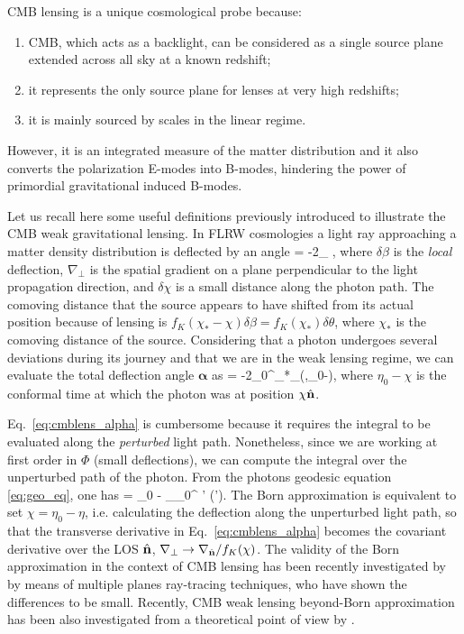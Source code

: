 \gls{CMB} lensing is a unique cosmological probe because:
\begin{enumerate} 
\item{\gls{CMB}, which acts as a backlight, can be 
considered as a single source plane extended across all sky at a known redshift;}
\item{it represents the only 
source plane for lenses at very high redshifts;} 
\item{it is mainly sourced by scales in the 
linear regime.} 
\end{enumerate}
However, it is an integrated measure of the matter distribution and it also converts the 
polarization E-modes into B-modes, hindering the power of primordial gravitational induced B-modes.

Let us recall here some useful definitions previously introduced to illustrate the \gls{CMB} weak gravitational 
lensing. In \gls{FLRW} cosmologies a light ray approaching a matter density distribution is deflected by an angle
%
\be
\delta\beta = -2\delta\chi\nabla_{\perp} \Phi,
\ee
%
where $\delta\beta$ is the \emph{local} deflection, $\nabla_{\perp}$ is the spatial gradient on a plane 
perpendicular to the light propagation direction, and $\delta\chi$ is a small distance along the photon path.
The comoving distance that the source appears to have shifted from its actual position because of lensing
is $f_K(\chi_*-\chi)\delta\beta = f_K(\chi_*)\delta\theta$, where $\chi_*$ is the comoving distance of the 
source. Considering that a photon undergoes several deviations during its journey and that we are in the
weak lensing regime, we can evaluate the total deflection angle $\bm{\alpha}$ as
%
\be
\label{eq:cmblens_alpha}
\bm{\alpha} = -2\int_0^{\chi_*}\diff\chi{}\nabla_{\perp}\Phi(\chi\nver,\eta_0-\chi),
\ee
%
where $\eta_0-\chi$ is the conformal time at which the photon was at position $\chi\hat{\mathbf{n}}$.

Eq.~\eqref{eq:cmblens_alpha} is cumbersome because it requires the integral to be evaluated along the 
\emph{perturbed} light path. Nonetheless, since we are working at first order in $\Phi$ (small deflections),
we can compute the integral over the unperturbed path of the photon. From the photons geodesic 
equation \eqref{eq:geo_eq}, one has
%
\be
\chi = \eta_0 - \int_{\eta_0}^{\eta} \diff \eta' \Phi(\eta').
\ee
%
The Born approximation is equivalent to set $\chi=\eta_0-\eta$, i.e. calculating the deflection along the 
unperturbed light path, so that the transverse derivative in Eq.~\eqref{eq:cmblens_alpha} becomes the 
covariant derivative over the LOS $\hat{\mathbf{n}}$, $\nabla_{\perp} \to \nabla_{\hat{\mathbf{n}}}/f_K(\chi)$. 
The validity of the Born approximation in the context of \gls{CMB} lensing has been recently investigated by 
\cite{Calabrese2015} by means of multiple planes ray-tracing techniques, who have shown the 
differences to be small. Recently, \gls{CMB} weak lensing beyond-Born approximation has been also investigated from a theoretical point of view by \citet{Hagstotz2015,Pratten2016,Marozzi2016}.

